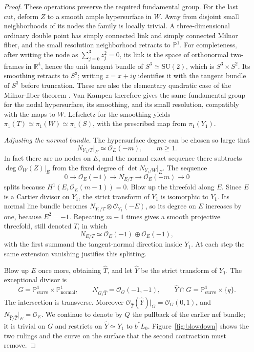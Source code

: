 \documentclass[11pt,reqno]{amsart}
\numberwithin{equation}{section}
\theoremstyle{definition}
\theoremstyle{remark}
\newcommand{\R}{\mathbb R}
\newcommand{\PP}{\mathbb P}
\begin{document}
\begin{proof}
These operations preserve the required fundamental group.  For the
last cut, deform $Z$ to a smooth ample hypersurface in $W$.  Away from
disjoint small neighborhoods of its nodes the family is locally
trivial.  A three-dimensional ordinary double point has simply
connected link and simply connected Milnor fiber, and the small
resolution neighborhood retracts to $\PP^1$.  For completeness, after
writing the node as $\sum_{j=0}^3 z_j^2=0$, its link is the space of
orthonormal two-frames in $\R^4$, hence the unit tangent bundle of
$S^3\simeq\mathrm{SU}(2)$, which is $S^3\times S^2$.  Its smoothing
retracts to $S^3$; writing $z=x+iy$ identifies it with the tangent
bundle of $S^3$ before truncation.  These are also the elementary
quadratic case of the Milnor-fiber theorem \cite{MilnorSingular}.
Van Kampen therefore gives the same fundamental group for the nodal
hypersurface, its smoothing, and its small resolution, compatibly with
the maps to $W$.  Lefschetz for the smoothing yields
$\pi_1(T)\simeq\pi_1(W)\simeq\pi_1(S)$, with the prescribed map
from $\pi_1(Y_1)$.

\smallskip
\noindent\emph{Adjusting the normal bundle.}
The hypersurface degree can be chosen so large that
\[
 N_{Y_1/T}|_E\simeq\mathcal O_E(-m),\qquad m\ge1.
\]
In fact there are no nodes on $E$, and the normal exact sequence there
subtracts $\deg\mathcal O_W(Z)|_E$ from the fixed degree of
$\det N_{Y_1/W}|_E$.  The sequence
\[
 0\longrightarrow\mathcal O_E(-1)
 \longrightarrow N_{E/T}
 \longrightarrow\mathcal O_E(-m)\longrightarrow0
\]
splits because
$H^1(E,\mathcal O_E(m-1))=0$.  Blow up the threefold along $E$.
Since $E$ is a Cartier divisor on $Y_1$, the strict transform of $Y_1$
is isomorphic to $Y_1$.  Its normal line bundle becomes
$N_{Y_1/T}\otimes\mathcal O_{Y_1}(-E)$, so its degree on $E$ increases
by one, because $E^2=-1$.  Repeating $m-1$ times gives a smooth
projective threefold, still denoted $T$, in which
\[
 N_{E/T}\simeq\mathcal O_E(-1)\oplus\mathcal O_E(-1),
\]
with the first summand the tangent-normal direction inside $Y_1$.
At each step the same extension vanishing justifies this splitting.

Blow up $E$ once more, obtaining $\widehat T$, and let $\widehat Y$
be the strict transform of $Y_1$.  The exceptional divisor is
\begin{equation}\label{proj:exceptional-quadric}
 G=\PP^1_{\mathrm{curve}}\times\PP^1_{\mathrm{normal}},\qquad
 N_{G/\widehat T}=\mathcal O_G(-1,-1),\qquad
 \widehat Y\cap G=\PP^1_{\mathrm{curve}}\times\{q\}.
\end{equation}
The intersection is transverse.  Moreover
$\mathcal O_{\widehat T}(\widehat Y)|_G=\mathcal O_G(0,1)$, and
$N_{\widehat Y/\widehat T}|_E=\mathcal O_E$.
We continue to denote by $Q$ the pullback of the earlier nef bundle;
it is trivial on $G$ and restricts on $\widehat Y\simeq Y_1$ to
$b^*L_0$.  Figure~\ref{fig:blowdown} shows the two rulings and the
curve on the surface that the second contraction must remove.


\end{proof}
\end{document}

